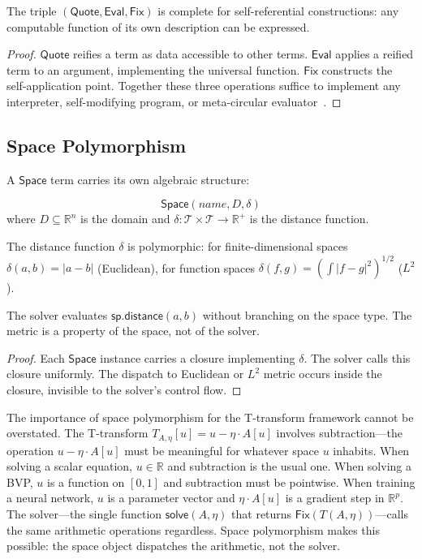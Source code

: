 \documentclass{lmcs}
\theoremstyle{plain}
\theoremstyle{definition}
\newcommand{\RR}{\mathbb{R}}
\newcommand{\fix}{\mathsf{Fix}}
\newcommand{\quoteop}{\mathsf{Quote}}
\newcommand{\evalop}{\mathsf{Eval}}
\newcommand{\Tcal}{\mathcal{T}}
\begin{document}
\begin{cor}\label{cor:selfref}
The triple $(\quoteop, \evalop, \fix)$ is complete for self-referential
constructions: any computable function of its own description can be
expressed.
\end{cor}

\begin{proof}
$\quoteop$ reifies a term as data accessible to other terms. $\evalop$
applies a reified term to an argument, implementing the universal
function. $\fix$ constructs the self-application point. Together these
three operations suffice to implement any interpreter, self-modifying
program, or meta-circular evaluator~\cite{barendregt1984}.
\end{proof}

\subsection{Space Polymorphism}

A $\mathsf{Space}$ term carries its own algebraic structure:

\begin{defi}[Space]
\[
\mathsf{Space}(\mathit{name}, D, \delta)
\]
where $D \subseteq \RR^n$ is the domain and $\delta : \Tcal \times \Tcal \to
\RR^+$ is the distance function.
\end{defi}

The distance function $\delta$ is polymorphic: for finite-dimensional spaces
$\delta(a, b) = |a - b|$ (Euclidean), for function spaces $\delta(f, g) =
(\int |f - g|^2)^{1/2}$ ($L^2$).

\begin{lem}\label{lem:space-poly}
The solver evaluates $\mathsf{sp}.\mathsf{distance}(a, b)$ without
branching on the space type. The metric is a property of the space, not of
the solver.
\end{lem}

\begin{proof}
Each $\mathsf{Space}$ instance carries a closure implementing $\delta$. The
solver calls this closure uniformly. The dispatch to Euclidean or $L^2$
metric occurs inside the closure, invisible to the solver's control flow.
\end{proof}

The importance of space polymorphism for the T-transform framework cannot be
overstated. The T-transform $T_{A,\eta}[u] = u - \eta \cdot A[u]$ involves
subtraction---the operation $u - \eta \cdot A[u]$ must be meaningful for
whatever space $u$ inhabits. When solving a scalar equation, $u \in \RR$ and
subtraction is the usual one. When solving a BVP, $u$ is a function on $[0,1]$
and subtraction must be pointwise. When training a neural network, $u$ is a
parameter vector and $\eta \cdot A[u]$ is a gradient step in $\RR^p$. The
solver---the single function $\mathsf{solve}(A, \eta)$ that returns
$\fix(T(A, \eta))$---calls the same arithmetic operations regardless. Space
polymorphism makes this possible: the space object dispatches the arithmetic,
not the solver.
\end{document}
